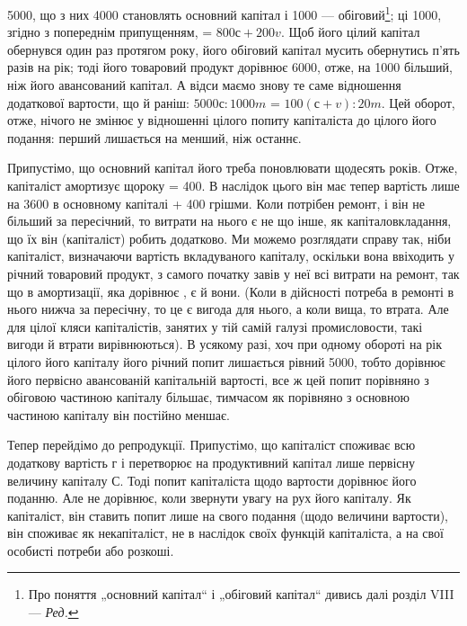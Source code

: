 \parcont{}  %
5000, що з них 4000 становлять основний капітал і
1000 — обіговий\footnote*{
Про поняття „основний капітал“ і „обіговий капітал“ дивись далі розділ
VIII — \emph{Ред.}
}; ці 1000, згідно з попереднім
припущенням, = $800с + 200v$. Щоб його цілий капітал обернувся
один раз протягом року, його обіговий капітал мусить обернутись п’ять
разів на рік; тоді його товаровий продукт дорівнює 6000,
отже, на 1000 більший, ніж його авансований капітал. А відси
маємо знову те саме відношення додаткової вартости, що й раніш:
$5000с: 1000m$ = $100 (с + v): 20m$. Цей оборот, отже, нічого не
змінює у відношенні цілого попиту капіталіста до цілого його подання:
перший лишається на  менший, ніж останнє.

Припустімо, що основний капітал його треба поновлювати щодесять
років. Отже, капіталіст амортизує щороку  = 400. В наслідок
цього він має тепер вартість лише на 3600 в основному капіталі
+ 400 грішми. Коли потрібен ремонт, і він не більший за
пересічний, то витрати на нього є не що інше, як капіталовкладання, що
їх він (капіталіст) робить додатково. Ми можемо розглядати справу так,
ніби капіталіст, визначаючи вартість вкладуваного капіталу, оскільки
вона ввіходить у річний товаровий продукт, з самого початку завів у
неї всі витрати на ремонт, так що в амортизації, яка дорівнює ,
є й вони. (Коли в дійсності потреба в ремонті в нього нижча
за пересічну, то це є вигода для нього, а коли вища, то втрата. Але
для цілої кляси капіталістів, занятих у тій самій галузі промисловости,
такі вигоди й втрати вирівнюються). В усякому разі, хоч при одному
обороті на рік цілого його капіталу його річний попит лишається рівний
5000, тобто дорівнює його первісно авансованій капітальній
вартості, все ж цей попит порівняно з обіговою частиною капіталу
більшає, тимчасом як порівняно з основною частиною капіталу він постійно
меншає.

Тепер перейдімо до репродукції. Припустімо, що капіталіст споживає
всю додаткову вартість $г$ і перетворює на продуктивний капітал лише
первісну величину капіталу С. Тоді попит капіталіста щодо вартости
дорівнює його поданню. Але не дорівнює, коли звернути увагу на рух
його капіталу. Як капіталіст, він ставить попит лише на  свого подання
(щодо величини вартости),  він споживає як некапіталіст, не
в наслідок своїх функцій капіталіста, а на свої особисті потреби або
розкоші.


